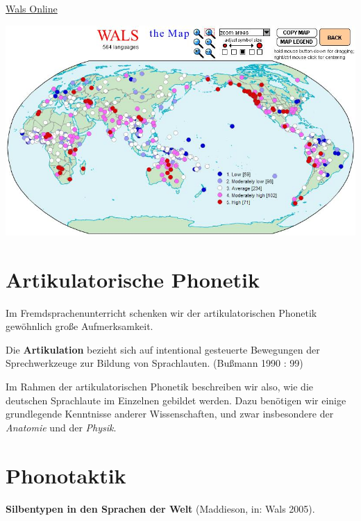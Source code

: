 \documentclass[
  letterpaper,
]{scrbook}
\begin{document}
\href{https://wals.info/}{Wals Online}

\includegraphics[width=1\textwidth,height=\textheight]{./pictures/01b_NSG_Intro_2020-10-07/wals_vowel_consonant_ratio.png}

\hypertarget{sec-artikulation}{%
\chapter{Artikulatorische Phonetik}\label{sec-artikulation}}

Im Fremdsprachenunterricht schenken wir der artikulatorischen Phonetik
gewöhnlich große Aufmerksamkeit.

Die \textbf{Artikulation} bezieht sich auf intentional gesteuerte
Bewegungen der Sprechwerkzeuge zur Bildung von Sprachlauten. (Bußmann
1990 : 99)

Im Rahmen der artikulatorischen Phonetik beschreiben wir also, wie die
deutschen Sprachlaute im Einzelnen gebildet werden. Dazu benötigen wir
einige grundlegende Kenntnisse anderer Wissenschaften, und zwar
insbesondere der \emph{Anatomie} und der \emph{Physik}.

\hypertarget{sec-phonotaktik}{%
\chapter{Phonotaktik}\label{sec-phonotaktik}}

\textbf{Silbentypen in den Sprachen der Welt} (Maddieson, in: Wals
2005).
\end{document}
